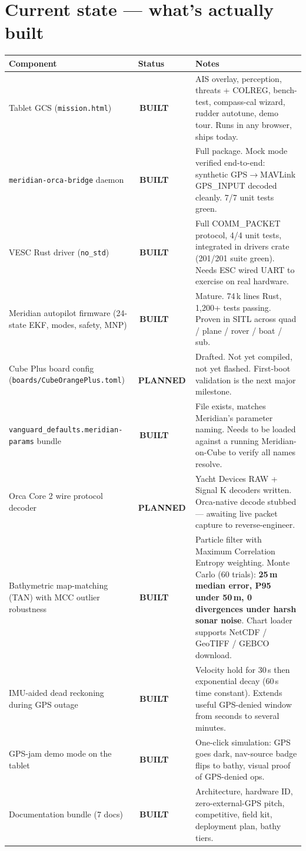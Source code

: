 \documentclass[10pt,a4paper]{article}
\newcommand{\statusbuilt}{{\color{white}\colorbox{mSafe}{\small\bfseries\,BUILT\,}}}
\newcommand{\statusplan}{{\color{white}\colorbox{mWarn}{\small\bfseries\,PLANNED\,}}}
\begin{document}
\section{Current state — what's actually built}
\begin{tabularx}{\textwidth}{@{}l l X@{}}
\toprule
\textbf{Component} & \textbf{Status} & \textbf{Notes} \\
\midrule
\rowcolor{mRow} Tablet GCS (\texttt{mission.html}) & \statusbuilt & AIS overlay, perception, threats + COLREG, bench-test, compass-cal wizard, rudder autotune, demo tour. Runs in any browser, ships today. \\
\texttt{meridian-orca-bridge} daemon & \statusbuilt & Full package. Mock mode verified end-to-end: synthetic GPS$\rightarrow$MAVLink GPS\_INPUT decoded cleanly. 7/7 unit tests green. \\
\rowcolor{mRow} VESC Rust driver (\texttt{no\_std}) & \statusbuilt & Full COMM\_PACKET protocol, 4/4 unit tests, integrated in drivers crate (201/201 suite green). Needs ESC wired UART to exercise on real hardware. \\
Meridian autopilot firmware (24-state EKF, modes, safety, MNP) & \statusbuilt & Mature. 74\,k lines Rust, 1{,}200+ tests passing. Proven in SITL across quad / plane / rover / boat / sub. \\
\rowcolor{mRow} Cube Plus board config (\texttt{boards/CubeOrangePlus.toml}) & \statusplan & Drafted. Not yet compiled, not yet flashed. First-boot validation is the next major milestone. \\
\texttt{vanguard\_defaults.meridian-params} bundle & \statusbuilt & File exists, matches Meridian's parameter naming. Needs to be loaded against a running Meridian-on-Cube to verify all names resolve. \\
\rowcolor{mRow} Orca Core 2 wire protocol decoder & \statusplan & Yacht Devices RAW + Signal K decoders written. Orca-native decode stubbed — awaiting live packet capture to reverse-engineer. \\
Bathymetric map-matching (TAN) with MCC outlier robustness & \statusbuilt & Particle filter with Maximum Correlation Entropy weighting. Monte Carlo (60 trials): {\bfseries 25\,m median error, P95 under 50\,m, 0 divergences under harsh sonar noise}. Chart loader supports NetCDF / GeoTIFF / GEBCO download. \\
\rowcolor{mRow} IMU-aided dead reckoning during GPS outage & \statusbuilt & Velocity hold for 30\,s then exponential decay (60\,s time constant). Extends useful GPS-denied window from seconds to several minutes. \\
GPS-jam demo mode on the tablet & \statusbuilt & One-click simulation: GPS goes dark, nav-source badge flips to bathy, visual proof of GPS-denied ops. \\
\rowcolor{mRow} Documentation bundle (7 docs) & \statusbuilt & Architecture, hardware ID, zero-external-GPS pitch, competitive, field kit, deployment plan, bathy tiers. \\
\bottomrule
\end{tabularx}
\end{document}

